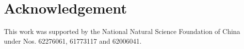 

\section{Acknowledgement}

This work was supported by the National Natural Science Foundation of China under Nos. 62276061, 61773117 and 62006041.







%
%	
%
%














